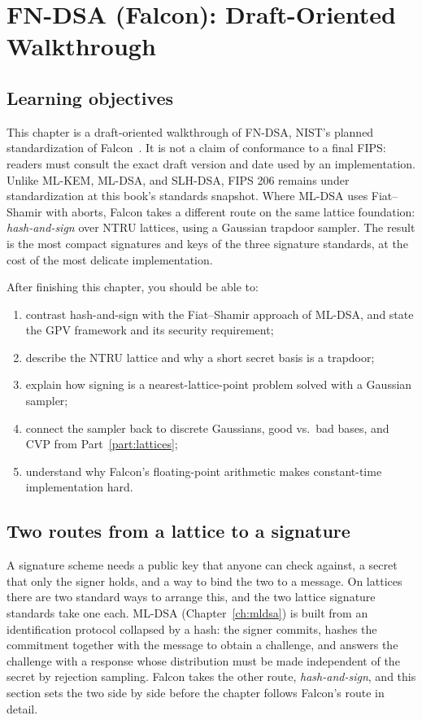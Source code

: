\chapter{FN-DSA (Falcon): Draft-Oriented Walkthrough}
\label{ch:fndsa}

\section{Learning objectives}

This chapter is a draft-oriented walkthrough of FN-DSA, NIST's planned standardization of Falcon~\cite{fips206,falcon2020}. It is not a claim of conformance to a final FIPS: readers must consult the exact draft version and date used by an implementation. Unlike ML-KEM, ML-DSA, and SLH-DSA, FIPS 206 remains under standardization at this book's standards snapshot. Where ML-DSA uses Fiat--Shamir with aborts, Falcon takes a different route on the same lattice foundation: \emph{hash-and-sign} over NTRU lattices, using a Gaussian trapdoor sampler. The result is the most compact signatures and keys of the three signature standards, at the cost of the most delicate implementation.

After finishing this chapter, you should be able to:

\begin{enumerate}
  \item contrast hash-and-sign with the Fiat--Shamir approach of ML-DSA, and state the GPV framework and its security requirement;
  \item describe the NTRU lattice and why a short secret basis is a trapdoor;
  \item explain how signing is a nearest-lattice-point problem solved with a Gaussian sampler;
  \item connect the sampler back to discrete Gaussians, good vs.\ bad bases, and CVP from Part~\ref{part:lattices};
  \item understand why Falcon's floating-point arithmetic makes constant-time implementation hard.
\end{enumerate}

\section{Two routes from a lattice to a signature}
\label{sec:hash-and-sign-vs-fs}

A signature scheme needs a public key that anyone can check against, a secret that only the signer holds, and a way to bind the two to a message. On lattices there are two standard ways to arrange this, and the two lattice signature standards take one each. ML-DSA (Chapter~\ref{ch:mldsa}) is built from an identification protocol collapsed by a hash: the signer commits, hashes the commitment together with the message to obtain a challenge, and answers the challenge with a response whose distribution must be made independent of the secret by rejection sampling. Falcon takes the other route, \emph{hash-and-sign}, and this section sets the two side by side before the chapter follows Falcon's route in detail.

